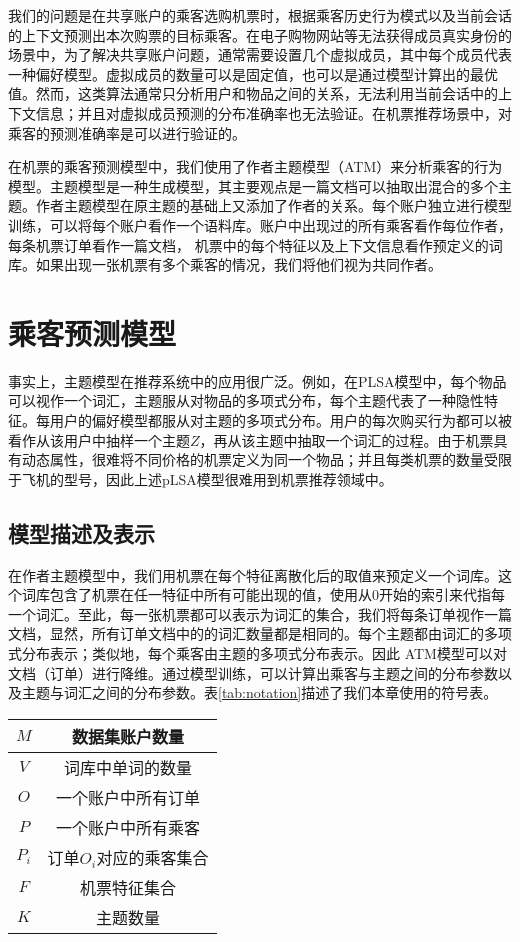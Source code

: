 我们的问题是在共享账户的乘客选购机票时，根据乘客历史行为模式以及当前会话的上下文预测出本次购票的目标乘客。在电子购物网站等无法获得成员真实身份的场景中，为了解决共享账户问题，通常需要设置几个虚拟成员，其中每个成员代表一种偏好模型。虚拟成员的数量可以是固定值，也可以是通过模型计算出的最优值。然而，这类算法通常只分析用户和物品之间的关系，无法利用当前会话中的上下文信息；并且对虚拟成员预测的分布准确率也无法验证。在机票推荐场景中，对乘客的预测准确率是可以进行验证的。

在机票的乘客预测模型中，我们使用了作者主题模型（ATM）来分析乘客的行为模型。主题模型是一种生成模型，其主要观点是一篇文档可以抽取出混合的多个主题。作者主题模型在原主题的基础上又添加了作者的关系。每个账户独立进行模型训练，可以将每个账户看作一个语料库。账户中出现过的所有乘客看作每位作者，每条机票订单看作一篇文档， 机票中的每个特征以及上下文信息看作预定义的词库。如果出现一张机票有多个乘客的情况，我们将他们视为共同作者。

\section{乘客预测模型}
事实上，主题模型在推荐系统中的应用很广泛。例如，在PLSA模型中，每个物品可以视作一个词汇，主题服从对物品的多项式分布，每个主题代表了一种隐性特征。每用户的偏好模型都服从对主题的多项式分布。用户的每次购买行为都可以被看作从该用户中抽样一个主题$Z$，再从该主题中抽取一个词汇的过程。由于机票具有动态属性，很难将不同价格的机票定义为同一个物品；并且每类机票的数量受限于飞机的型号，因此上述pLSA模型很难用到机票推荐领域中。

\subsection{模型描述及表示}

在作者主题模型中，我们用机票在每个特征离散化后的取值来预定义一个词库。这个词库包含了机票在任一特征中所有可能出现的值，使用从0开始的索引来代指每一个词汇。至此，每一张机票都可以表示为词汇的集合，我们将每条订单视作一篇文档，显然，所有订单文档中的的词汇数量都是相同的。每个主题都由词汇的多项式分布表示；类似地，每个乘客由主题的多项式分布表示。因此
ATM模型可以对文档（订单）进行降维。通过模型训练，可以计算出乘客与主题之间的分布参数以及主题与词汇之间的分布参数。表\ref{tab:notation}描述了我们本章使用的符号表。

\begin{table}[!hpb]
\centering
\begin{tabular}{|c|c|} \hline
$M$ & 数据集账户数量\\ \hline
$V$ & 词库中单词的数量\\ \hline
$O$ & 一个账户中所有订单\\ \hline
$P$ & 一个账户中所有乘客\\ \hline
$P_i$ & 订单$O_i$对应的乘客集合 \\ \hline
$F$ & 机票特征集合\\ \hline
$K$ & 主题数量\\ \hline
\end{tabular}
\end{table}

